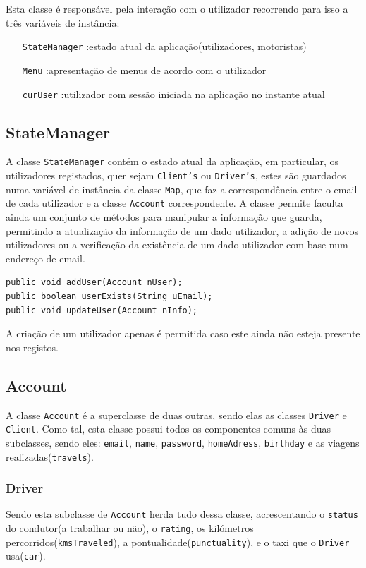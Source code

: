 \documentclass[a4paper,10pt,portuguese]{article}
\begin{document}
Esta classe é responsável pela interação com o utilizador recorrendo para isso a três variáveis de instância: 
\begin{itemize}
\item[\texttt{StateManager}] :estado atual da aplicação(utilizadores, motoristas)
\item[\texttt{Menu}] :apresentação de menus de acordo com o utilizador
\item[\texttt{curUser}] :utilizador com sessão iniciada na aplicação no instante atual 
\end{itemize}

\subsection{StateManager}
A classe \texttt{StateManager} contém o estado atual da aplicação, em particular, os utilizadores registados, quer sejam \texttt{Client's} ou \texttt{Driver's}, estes são guardados numa variável de instância da classe \texttt{Map}, que faz a correspondência entre o email de cada utilizador e a classe \texttt{Account} correspondente.
A classe permite faculta ainda um conjunto de métodos para manipular a informação que guarda, permitindo a atualização da informação de um dado utilizador, a adição de novos utilizadores ou a verificação da existência de um dado utilizador com base num endereço de email.
\begin{verbatim}
public void addUser(Account nUser);
public boolean userExists(String uEmail);
public void updateUser(Account nInfo); 
\end{verbatim}
A criação de um utilizador apenas é permitida caso este ainda não esteja presente nos registos.

\subsection{Account}
A classe \texttt{Account} é a superclasse de duas outras, sendo elas as classes \texttt{Driver} e \texttt{Client}. Como tal, esta classe possui todos os componentes comuns às duas subclasses, sendo eles: \texttt{email}, \texttt{name}, \texttt{password}, \texttt{homeAdress}, \texttt{birthday} e as viagens realizadas(\texttt{travels}).
\subsubsection{Driver}
Sendo esta subclasse de \texttt{Account} herda tudo dessa classe, acrescentando o \texttt{status} do condutor(a trabalhar ou não), o \texttt{rating}, os kilómetros percorridos(\texttt{kmsTraveled}), a pontualidade(\texttt{punctuality}), e o taxi que o \texttt{Driver} usa(\texttt{car}).
\end{document}
